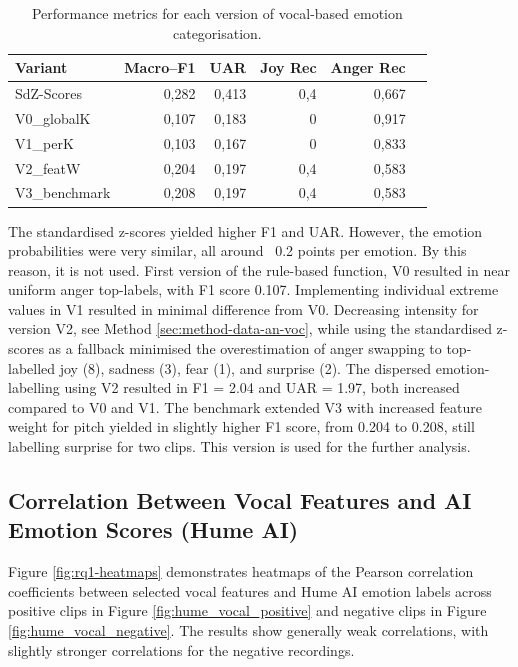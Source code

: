 \begin{table}[ht]
    \centering
    \begin{tabular}{lrrrrr}
      \toprule
      Variant       & Macro–F1 &   UAR  & Joy Rec & Anger Rec  \\
      \midrule
      SdZ-Scores    &   0,282  &  0,413 &    0,4  &     0,667 &        \\
      V0\_globalK   &   0,107  &  0,183 &    0    &     0,917 &        \\
      V1\_perK      &   0,103  &  0,167 &    0    &     0,833 &        \\
      V2\_featW    &   0,204  &  0,197 &    0,4  &     0,583 &        \\
      V3\_benchmark     &   0,208  &  0,197 &    0,4  &     0,583 &        \\
      \bottomrule
    \end{tabular}
    \caption{Performance metrics for each version of vocal-based emotion categorisation.}
    \label{tab:rq1_categor.func-stats}
  \end{table}
  The standardised z-scores yielded higher F1 and UAR. However, the emotion probabilities were very similar, all around ~0.2 points per emotion. By this reason, it is not used. 
  First version of the rule-based function, V0 resulted in near uniform anger top-labels, with F1 score 0.107. Implementing individual extreme values in V1 resulted in minimal difference from V0.
  Decreasing intensity for version V2, see Method \ref{sec:method-data-an-voc}, while using the standardised z-scores as a fallback minimised the overestimation of anger swapping to top-labelled joy (8), sadness (3), fear (1), and surprise (2).
   The dispersed emotion-labelling using V2 resulted in F1 = 2.04 and UAR = 1.97, both increased compared to V0 and V1. 
  The benchmark extended V3 with increased feature weight for pitch yielded in slightly higher F1 score, from 0.204 to 0.208, still labelling surprise for two clips. This version is used for the further analysis. 
  

\subsection{Correlation Between Vocal Features and AI Emotion Scores (Hume AI)}
Figure \ref{fig:rq1-heatmaps} demonstrates heatmaps of the Pearson correlation coefficients between selected vocal features and Hume AI emotion labels across positive clips in Figure \ref{fig:hume_vocal_positive} and negative clips in Figure \ref{fig:hume_vocal_negative}. The results show generally weak correlations, with slightly stronger correlations for the negative recordings.  

